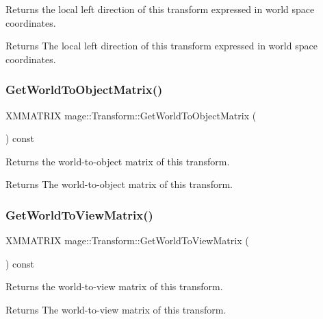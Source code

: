 Returns the local left direction of this transform expressed in world space coordinates.

\begin{DoxyReturn}{Returns}
The local left direction of this transform expressed in world space coordinates. 
\end{DoxyReturn}
\hypertarget{structmage_1_1_transform_a773c1db9e475deb6d9f446a88cfae30f}{}\label{structmage_1_1_transform_a773c1db9e475deb6d9f446a88cfae30f} 
\subsubsection{\texorpdfstring{Get\+World\+To\+Object\+Matrix()}{GetWorldToObjectMatrix()}}
{\footnotesize\ttfamily X\+M\+M\+A\+T\+R\+IX mage\+::\+Transform\+::\+Get\+World\+To\+Object\+Matrix (\begin{DoxyParamCaption}{ }\end{DoxyParamCaption}) const}

Returns the world-\/to-\/object matrix of this transform.

\begin{DoxyReturn}{Returns}
The world-\/to-\/object matrix of this transform. 
\end{DoxyReturn}
\hypertarget{structmage_1_1_transform_a33cc590d779f69044d183bab653bd260}{}\label{structmage_1_1_transform_a33cc590d779f69044d183bab653bd260} 
\subsubsection{\texorpdfstring{Get\+World\+To\+View\+Matrix()}{GetWorldToViewMatrix()}}
{\footnotesize\ttfamily X\+M\+M\+A\+T\+R\+IX mage\+::\+Transform\+::\+Get\+World\+To\+View\+Matrix (\begin{DoxyParamCaption}{ }\end{DoxyParamCaption}) const}

Returns the world-\/to-\/view matrix of this transform.

\begin{DoxyReturn}{Returns}
The world-\/to-\/view matrix of this transform. 
\end{DoxyReturn}
\hypertarget{structmage_1_1_transform_af28786b745a144eef74d69a55055b00a}{}\label{structmage_1_1_transform_af28786b745a144eef74d69a55055b00a} 
